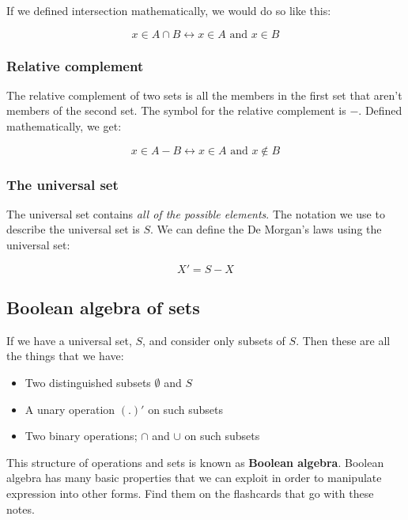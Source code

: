 If we defined intersection mathematically, we would do so like this:

\begin{dmath*}
	{x \in A \cap B \leftrightarrow x \in A \textrm{ and } x \in B}
\end{dmath*}

\subsubsection{Relative complement}

The relative complement of two sets is all the members in the first set that
aren't members of the second set. The symbol for the relative complement is $-$.
Defined mathematically, we get:

\begin{dmath*}
	{x \in A - B} \leftrightarrow {x \in A \textrm{ and } x \notin B}
\end{dmath*}

\subsubsection{The universal set}
\label{subsubsec:universal_set}

The universal set contains {\it all of the possible elements}. The notation we
use to describe the universal set is $S$. We can define the De Morgan's laws
using the universal set:

\begin{dmath*}
	X' = S - X
\end{dmath*}

\subsection{Boolean algebra of sets}

If we have a universal set, $S$, and consider only subsets of $S$. Then these
are all the things that we have:

\begin{itemize}
	\item Two distinguished subsets $\emptyset$ and $S$
	\item A unary operation $(.)'$ on such subsets
	\item Two binary operations; $\cap$ and $\cup$ on such subsets
\end{itemize}

This structure of operations and sets is known as {\bf Boolean algebra}. Boolean
algebra has many basic properties that we can exploit in order to manipulate
expression into other forms. Find them on the flashcards that go with these
notes.

